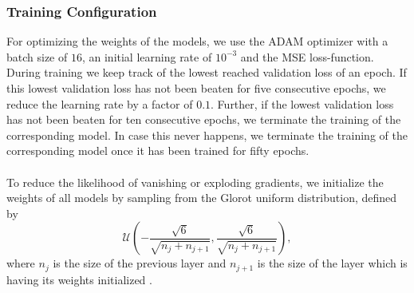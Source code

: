 \documentclass[./main.tex]{subfiles}
\begin{document}
\subsubsection{Training Configuration} For optimizing the weights of the models, we use the ADAM optimizer with a batch size of $16$, an initial learning rate of $10^{-3}$ and the MSE loss-function. During training we keep track of the lowest reached validation loss of an epoch. If this lowest validation loss has not been beaten for five consecutive epochs, we reduce the learning rate by a factor of $0.1$. Further, if the lowest validation loss has not been beaten for ten consecutive epochs, we terminate the training of the corresponding model. In case this never happens, we terminate the training of the corresponding model once it has been trained for fifty epochs.
\\
\\
To reduce the likelihood of vanishing or exploding gradients, we initialize the weights of all models by sampling from the Glorot uniform distribution, defined by
\begin{equation}
    \mathcal{U} \left(- \frac{\sqrt{6}}{\sqrt{n_j + n_{j + 1}}}, \frac{\sqrt{6}}{\sqrt{n_j + n_{j + 1}}} \right),
\end{equation}
where $n_j$ is the size of the previous layer and $n_{j + 1}$ is the size of the layer which is having its weights initialized \cite{glorot2010understanding}.
\end{document}
